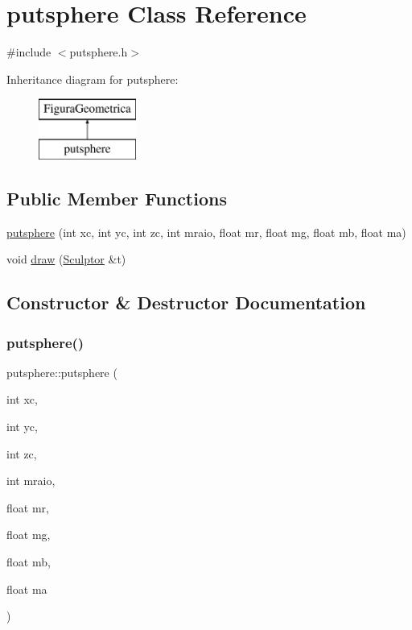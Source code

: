 \hypertarget{classputsphere}{}\section{putsphere Class Reference}
\label{classputsphere}


{\ttfamily \#include $<$putsphere.\+h$>$}

Inheritance diagram for putsphere\+:\begin{figure}[H]
\begin{center}
\leavevmode
\includegraphics[height=2.000000cm]{classputsphere}
\end{center}
\end{figure}
\subsection*{Public Member Functions}
\begin{DoxyCompactItemize}
\item 
\mbox{\hyperlink{classputsphere_af9f4e66a42039c842d3a52a514e9f80a}{putsphere}} (int xc, int yc, int zc, int mraio, float mr, float mg, float mb, float ma)
\item 
void \mbox{\hyperlink{classputsphere_afb72d04545c9a049d82d6faa5cb18954}{draw}} (\mbox{\hyperlink{class_sculptor}{Sculptor}} \&t)
\end{DoxyCompactItemize}


\subsection{Constructor \& Destructor Documentation}
\mbox{\label{classputsphere_af9f4e66a42039c842d3a52a514e9f80a}} 
\subsubsection{\texorpdfstring{putsphere()}{putsphere()}}
{\footnotesize\ttfamily putsphere\+::putsphere (\begin{DoxyParamCaption}\item[{int}]{xc,  }\item[{int}]{yc,  }\item[{int}]{zc,  }\item[{int}]{mraio,  }\item[{float}]{mr,  }\item[{float}]{mg,  }\item[{float}]{mb,  }\item[{float}]{ma }\end{DoxyParamCaption})}



